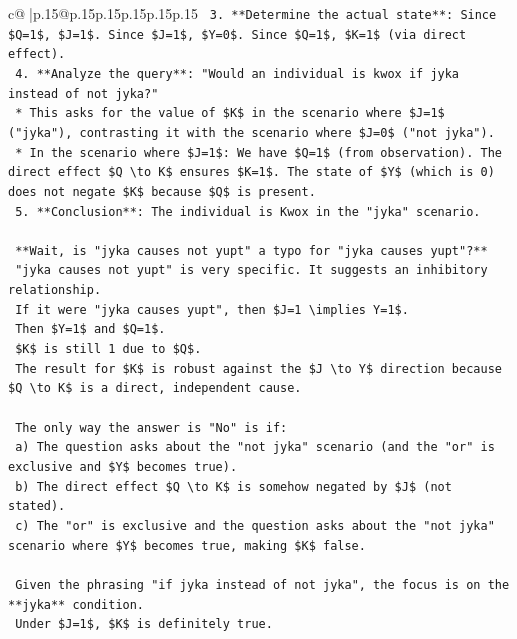 \documentclass{article}
\begin{document}
{\begin{supertabular}{c@{$\;$}|p{.15\linewidth}@{}p{.15\linewidth}p{.15\linewidth}p{.15\linewidth}p{.15\linewidth}p{.15\linewidth}}
{{{\texttt{    3.  **Determine the actual state**: Since \$Q=1\$, \$J=1\$. Since \$J=1\$, \$Y=0\$. Since \$Q=1\$, \$K=1\$ (via direct effect).} \\
\texttt{    4.  **Analyze the query**: "Would an individual is kwox if jyka instead of not jyka?"} \\
\texttt{        *   This asks for the value of \$K\$ in the scenario where \$J=1\$ ("jyka"), contrasting it with the scenario where \$J=0\$ ("not jyka").} \\
\texttt{        *   In the scenario where \$J=1\$: We have \$Q=1\$ (from observation). The direct effect \$Q \textbackslash{}to K\$ ensures \$K=1\$. The state of \$Y\$ (which is 0) does not negate \$K\$ because \$Q\$ is present.} \\
\texttt{    5.  **Conclusion**: The individual is Kwox in the "jyka" scenario.} \\
\\ 
\texttt{    **Wait, is "jyka causes not yupt" a typo for "jyka causes yupt"?**} \\
\texttt{    "jyka causes not yupt" is very specific. It suggests an inhibitory relationship.} \\
\texttt{    If it were "jyka causes yupt", then \$J=1 \textbackslash{}implies Y=1\$.} \\
\texttt{    Then \$Y=1\$ and \$Q=1\$.} \\
\texttt{    \$K\$ is still 1 due to \$Q\$.} \\
\texttt{    The result for \$K\$ is robust against the \$J \textbackslash{}to Y\$ direction because \$Q \textbackslash{}to K\$ is a direct, independent cause.} \\
\\ 
\texttt{    The only way the answer is "No" is if:} \\
\texttt{    a) The question asks about the "not jyka" scenario (and the "or" is exclusive and \$Y\$ becomes true).} \\
\texttt{    b) The direct effect \$Q \textbackslash{}to K\$ is somehow negated by \$J\$ (not stated).} \\
\texttt{    c) The "or" is exclusive and the question asks about the "not jyka" scenario where \$Y\$ becomes true, making \$K\$ false.} \\
\\ 
\texttt{    Given the phrasing "if jyka instead of not jyka", the focus is on the **jyka** condition.} \\
\texttt{    Under \$J=1\$, \$K\$ is definitely true.} \\
}}}
\end{supertabular}}
\end{document}
